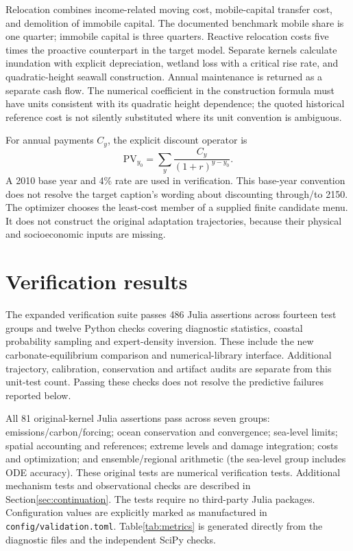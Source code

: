 \documentclass[11pt]{article}
\begin{document}
Relocation combines income-related moving cost, mobile-capital transfer cost,
and demolition of immobile capital. The documented benchmark mobile share is
one quarter; immobile capital is three quarters. Reactive relocation costs five
times the proactive counterpart in the target model. Separate kernels calculate
inundation with explicit depreciation, wetland loss with a critical rise rate,
and quadratic-height seawall construction. Annual maintenance is returned as
a separate cash flow. The numerical coefficient in the construction formula
must have units consistent with its quadratic height dependence; the quoted
historical reference cost is not silently substituted where its unit convention
is ambiguous.

For annual payments $C_y$, the explicit discount operator is
\begin{equation}
\mathrm{PV}_{y_0}=\sum_y\frac{C_y}{(1+r)^{y-y_0}}.
\end{equation}
A 2010 base year and 4\% rate are used in verification. This base-year convention
does not resolve the target caption's wording about discounting through/to 2150.
The optimizer chooses the least-cost member of a supplied finite candidate
menu. It does not construct the original adaptation trajectories, because their
physical and socioeconomic inputs are missing.

\section{Verification results}

The expanded verification suite passes 486 Julia assertions across fourteen
test groups and twelve Python checks covering diagnostic statistics, coastal
probability sampling and expert-density inversion. These include the new
carbonate-equilibrium comparison and numerical-library interface. Additional
trajectory, calibration, conservation and artifact audits are separate from this
unit-test count. Passing these checks does not resolve the predictive failures
reported below.

All 81 original-kernel Julia assertions pass across seven groups: emissions/carbon/forcing;
ocean conservation and convergence; sea-level limits; spatial accounting and
references; extreme levels and damage integration; costs and optimization;
and ensemble/regional arithmetic (the sea-level group includes ODE accuracy).
These original tests are numerical verification tests. Additional mechanism tests
and observational checks are described in Section\ref{sec:continuation}.
The tests require no third-party Julia packages. Configuration values are
explicitly marked as manufactured in \texttt{config/validation.toml}.
Table\ref{tab:metrics} is generated directly from the diagnostic files and the
independent SciPy checks.
\end{document}
